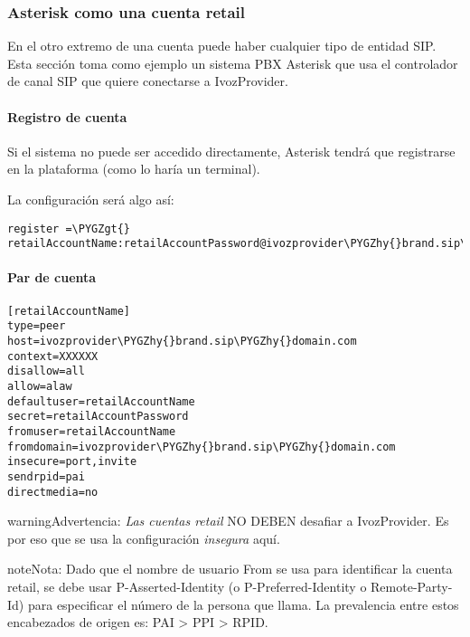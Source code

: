 \documentclass[letterpaper,10pt,spanish]{sphinxmanual}
\def\PYGZgt{\char`\>}
\def\PYGZhy{\char`\-}
\begin{document}
\subsubsection{Asterisk como una cuenta retail}
\label{administration_portal/client/retail/retail_accounts:asterisk-as-a-retail-account}
En el otro extremo de una cuenta puede haber cualquier tipo de entidad SIP. Esta sección toma como ejemplo un sistema PBX Asterisk que usa el controlador de canal SIP que quiere conectarse a IvozProvider.


\paragraph{Registro de cuenta}
\label{administration_portal/client/retail/retail_accounts:account-register}
Si el sistema no puede ser accedido directamente, Asterisk tendrá que registrarse en la plataforma (como lo haría un terminal).

La configuración será algo así:

\begin{Verbatim}[commandchars=\\\{\}]
register =\PYGZgt{} retailAccountName:retailAccountPassword@ivozprovider\PYGZhy{}brand.sip\PYGZhy{}domain.com
\end{Verbatim}


\paragraph{Par de cuenta}
\label{administration_portal/client/retail/retail_accounts:account-peer}
\begin{Verbatim}[commandchars=\\\{\}]
[retailAccountName]
type=peer
host=ivozprovider\PYGZhy{}brand.sip\PYGZhy{}domain.com
context=XXXXXX
disallow=all
allow=alaw
defaultuser=retailAccountName
secret=retailAccountPassword
fromuser=retailAccountName
fromdomain=ivozprovider\PYGZhy{}brand.sip\PYGZhy{}domain.com
insecure=port,invite
sendrpid=pai
directmedia=no
\end{Verbatim}

\begin{notice}{warning}{Advertencia:}
\emph{Las cuentas retail} NO DEBEN desafiar a IvozProvider. Es por eso que se usa la configuración \emph{insegura} aquí.
\end{notice}

\begin{notice}{note}{Nota:}
Dado que el nombre de usuario From se usa para identificar la cuenta retail, se debe usar P-Asserted-Identity (o P-Preferred-Identity o Remote-Party-Id) para especificar el número de la persona que llama. La prevalencia entre estos encabezados de origen es: PAI \textgreater{} PPI \textgreater{} RPID.
\end{notice}
\end{document}
